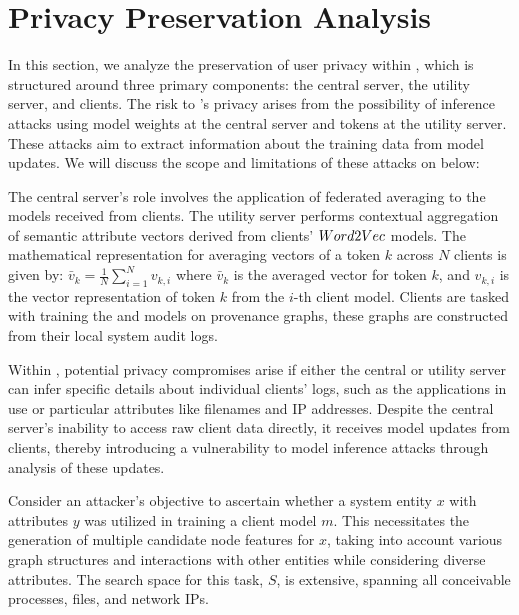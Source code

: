 \section{Privacy Preservation Analysis}
\label{sec:privacy}


In this section, we analyze the preservation of user privacy within \Sys, which is structured around three primary components: the central server, the utility server, and clients. The risk to \Sys's privacy arises from the possibility of inference attacks using model weights at the central server and \wordvec tokens at the utility server. These attacks aim to extract information about the training data from model updates. We will discuss the scope and limitations of these attacks on \Sys below:

 The central server's role involves the application of federated averaging to the \gnnshort models received from clients. The utility server performs contextual aggregation of semantic attribute vectors derived from clients' \(Word2Vec\) models.  The mathematical representation for averaging vectors of a token \(k\) across \(N\) clients is given by: \( \bar{v}_k = \frac{1}{N} \sum_{i=1}^{N} v_{k,i} \) where \(\bar{v}_k\) is the averaged vector for token \(k\), and \(v_{k,i}\) is the vector representation of token \(k\) from the \(i\)-th client model. Clients are tasked with training the \wordvec and \gnnshort models on provenance graphs, these graphs are constructed from their local system audit logs.

 Within \Sys, potential privacy compromises arise if either the central or utility server can infer specific details about individual clients' logs, such as the applications in use or particular attributes like filenames and IP addresses. Despite the central server's inability to access raw client data directly, it receives model updates from clients, thereby introducing a vulnerability to model inference attacks through analysis of these updates.

Consider an attacker's objective to ascertain whether a system entity \(x\) with attributes \(y\) was utilized in training a client model \(m\). This necessitates the generation of multiple candidate node features for \(x\), taking into account various graph structures and interactions with other entities while considering diverse attributes. The search space for this task, \(S\), is extensive, spanning all conceivable processes, files, and network IPs.

